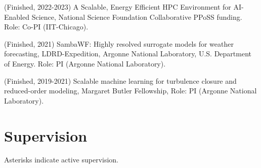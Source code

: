 \documentclass[letterpaper]{article}
\renewenvironment{itemize}{
  \begin{list}{}{
    \setlength{\leftmargin}{1.5em}
  }
}{
  \end{list}
}
\begin{document}
\begin{itemize}
  \item (Finished, 2022-2023) A Scalable, Energy Efficient HPC Environment for AI-Enabled Science, National Science Foundation Collaborative PPoSS funding. Role: Co-PI (IIT-Chicago).

  \item (Finished, 2021) SambaWF: Highly resolved surrogate models for weather forecasting, LDRD-Expedition, Argonne National Laboratory, U.S. Department of Energy. Role: PI (Argonne National Laboratory).

  \item (Finished, 2019-2021) Scalable machine learning for turbulence closure and reduced-order modeling, Margaret Butler Fellowship, Role: PI (Argonne National Laboratory).


\end{itemize}


\section*{Supervision}

Asterisks indicate active supervision.
\end{document}

